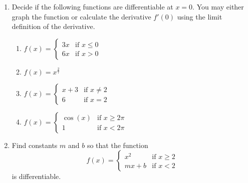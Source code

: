 \documentclass[11pt]{article}
\begin{document}
\drawtitle
\begin{enumerate}

\item Decide if the following functions are differentiable at $x=0$.
  You may either graph the function or calculate the derivative
  $f'(0)$ using the limit definition of the derivative.
  \begin{enumerate}
  \item $\displaystyle f(x) = \begin{cases} 3x &\mbox{if } x\leq 0\\
      6x &\mbox{if } x > 0 \end{cases}$
    \vfill
  \item $f(x) = x^{\frac{2}{7}}$
    \vfill
  \item $\displaystyle f(x) = \begin{cases}
      x+3 &\mbox{if } x\neq 2\\
      6 &\mbox{if } x = 2 \end{cases}$
    \vfill
  \item $\displaystyle f(x) = \begin{cases}
      \cos(x) &\mbox{if } x\geq 2\pi\\
      1 &\mbox{if } x < 2\pi \end{cases}$
    \vfill
  \end{enumerate}

\newpage

\item Find constants $m$ and $b$ so that the function
  \[
  f(x) = \begin{cases} x^2 &\mbox{if } x\geq 2\\
    mx+b &\mbox{if } x < 2 \end{cases}
  \]
  is differentiable.
\end{enumerate}
\end{document}
